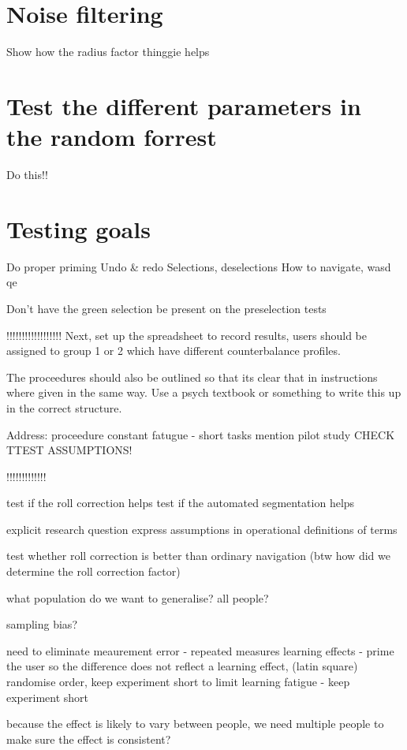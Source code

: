 \section{Noise filtering}

Show how the radius factor thinggie helps

\section{Test the different parameters in the random forrest}

Do this!!

\section{Testing goals}

Do proper priming
Undo & redo
Selections, deselections
How to navigate, wasd qe

Don't have the green selection be present on the preselection tests


!!!!!!!!!!!!!!!!!!
Next, set up the spreadsheet to record results, users should be assigned to group 1 or 2 which have different counterbalance profiles.

The proceedures should also be outlined so that its clear that in instructions where given in the same way. Use a psych textbook or something to write this up in the correct structure.

Address:
proceedure constant
fatugue - short tasks
mention pilot study
CHECK TTEST ASSUMPTIONS!

!!!!!!!!!!!!!


test if the roll correction helps
test if the automated segmentation helps


explicit research question
express assumptions in operational definitions of terms

test whether roll correction is better than ordinary navigation
(btw how did we determine the roll correction factor)

what population do we want to generalise?
all people?

sampling bias?

need to eliminate meaurement error - repeated measures
learning effects - prime the user so the difference does not reflect a learning effect, (latin square) randomise order, keep experiment short to limit learning
fatigue - keep experiment short

because the effect is likely to vary between people, we need multiple people to make sure the effect is consistent?


